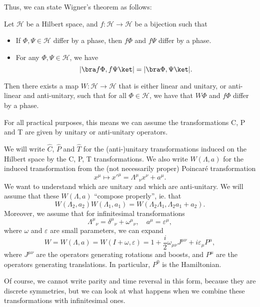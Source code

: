 \documentclass[a4paper]{article}
\begin{document}
Thus, we can state Wigner's theorem as follows:
\begin{thm} %
  Let $\mathcal{H}$ be a Hilbert space, and $f: \mathcal{H} \to \mathcal{H}$ be a bijection such that
  \begin{itemize}
    \item If $\Phi, \Psi \in \mathcal{H}$ differ by a phase, then $f\Phi$ and $f\Psi$ differ by a phase.
    \item For any $\Phi, \Psi \in \mathcal{H}$, we have
      \[
        |\bra f\Phi, f\Psi\ket| = |\bra \Phi, \Psi\ket|.
      \]
  \end{itemize}
  Then there exists a map $W: \mathcal{H} \to \mathcal{H}$ that is either linear and unitary, or anti-linear and anti-unitary, such that for all $\Phi \in \mathcal{H}$, we have that $W\Phi$ and $f\Phi$ differ by a phase.
\end{thm}

For all practical purposes, this means we can assume the transformations C, P and T are given by unitary or anti-unitary operators.

We will write $\hat{C}$, $\hat{P}$ and $\hat{T}$ for the (anti-)unitary transformations induced on the Hilbert space by the C, P, T transformations. We also write $W(\Lambda, a)$ for the induced transformation from the (not necessarily proper) Poincar\'e transformation 
\[
  x^\mu \mapsto x'^\mu = \Lambda^\mu\!_\nu x^\nu + a^\mu.
\]
We want to understand which are unitary and which are anti-unitary. We will assume that these $W(\Lambda, a)$ ``compose properly'', ie. that
\[
  W(\Lambda_2, a_2)W(\Lambda_1, a_1) = W(\Lambda_2 \Lambda_1, \Lambda_2 a_1 + a_2).
\]
Moreover, we assume that for infinitesimal transformations
\[
  \Lambda^\mu\!_\nu = \delta^\mu\!_\nu + \omega^\mu\!_\nu,\quad a^\mu = \varepsilon^\mu,
\]
where $\omega$ and $\varepsilon$ are small parameters, we can expand
\[
  W = W(\Lambda, a) = W(I + \omega, \varepsilon) = 1 + \frac{i}{2} \omega_{\mu\nu} J^{\mu\nu} + i \varepsilon_\mu P^\mu,
\]
where $J^{\mu\nu}$ are the operators generating rotations and boosts, and $P^\mu$ are the operators generating translations. In particular, $P^0$ is the Hamiltonian.

Of course, we cannot write parity and time reversal in this form, because they are discrete symmetries, but we can look at what happens when we combine these transformations with infinitesimal ones.
\end{document}
